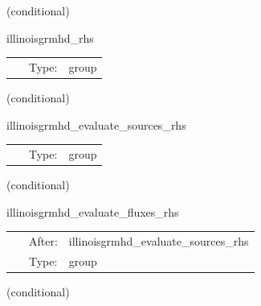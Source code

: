 \documentclass{article}
\begin{document}
\vspace{5mm}

   (conditional) 

\hspace{5mm} illinoisgrmhd\_rhs 

\hspace{5mm}{\it evaluate rhss grhd equations } 


\hspace{5mm}

 \begin{tabular*}{160mm}{cll} 
~ & Type:  & group \\ 
\end{tabular*} 


\vspace{5mm}

   (conditional) 

\hspace{5mm} illinoisgrmhd\_evaluate\_sources\_rhs 

\hspace{5mm}{\it evaluate source terms in grmhd rhss } 


\hspace{5mm}

 \begin{tabular*}{160mm}{cll} 
~ & Type:  & group \\ 
\end{tabular*} 


\vspace{5mm}

   (conditional) 

\hspace{5mm} illinoisgrmhd\_evaluate\_fluxes\_rhs 

\hspace{5mm}{\it evaluate flux terms in grmhd rhss } 


\hspace{5mm}

 \begin{tabular*}{160mm}{cll} 
~ & After:  & illinoisgrmhd\_evaluate\_sources\_rhs \\ 
~ & Type:  & group \\ 
\end{tabular*} 


\vspace{5mm}

   (conditional) 
\end{document}
